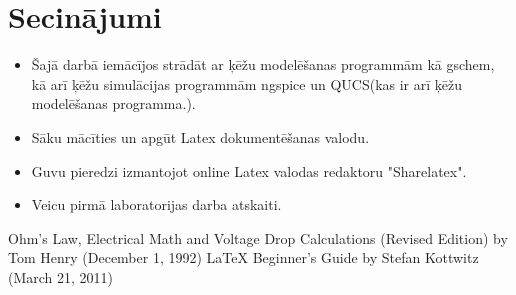 \documentclass{report}
\begin{document}
\chapter{Secinājumi}
\begin{itemize}
\item Šajā darbā iemācījos strādāt ar ķēžu modelēšanas programmām kā gschem, kā arī ķēžu simulācijas programmām ngspice un QUCS(kas ir arī ķēžu modelēšanas programma.).
\item Sāku mācīties un apgūt Latex\cite{latex} dokumentēšanas valodu.
\item Guvu pieredzi izmantojot online Latex valodas redaktoru "Sharelatex".
\item Veicu pirmā laboratorijas darba atskaiti.
\end {itemize}
\begin{thebibliography}{1}
Ohm's Law, Electrical Math and Voltage Drop Calculations (Revised Edition) by Tom Henry (December 1, 1992)
LaTeX Beginner's Guide by Stefan Kottwitz (March 21, 2011)

\end{thebibliography}
\end{document}
